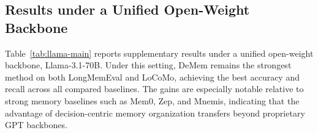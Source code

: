 \documentclass{article}
\theoremstyle{plain}
\theoremstyle{definition}
\theoremstyle{remark}
\begin{document}
\subsection{Results under a Unified Open-Weight Backbone}
\label{app:llama-results}
\begin{table}[t]
\centering
\small
\setlength{\tabcolsep}{5pt}
\caption{\textbf{Supplementary open-weight backbone results.}
We report accuracy (Acc.) and recall (Rec.) on LongMemEval and LoCoMo under
Llama-3.1-70B-Instruct-Turbo. Values are percentages, reported as mean
\(\pm\) one sample standard deviation over \(R=5\) independent full-pipeline runs.
DeMem achieves the highest mean scores across both benchmarks under
the same backbone.}
\label{tab:llama-main}
Table~\ref{tab:llama-main} reports supplementary results under a unified open-weight backbone, Llama-3.1-70B. 
Under this setting, DeMem remains the strongest method on both LongMemEval and LoCoMo, achieving the best accuracy and recall across all compared baselines. 
The gains are especially notable relative to strong memory baselines such as Mem0, Zep, and Mnemis, indicating that the advantage of decision-centric memory organization transfers beyond proprietary GPT backbones.
\end{table}
\end{document}
